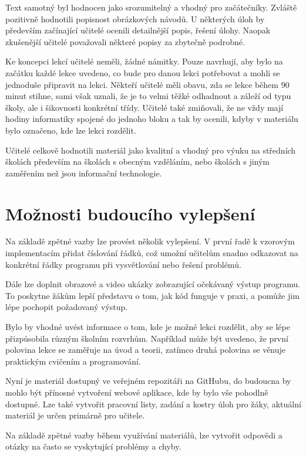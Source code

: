 \documentclass[
  digital,     %
  oneside,     %
  nosansbold,  %
  colorbold, %
  lof,         %
  nolot,         %
]{fithesis4}
\begin{document}
Text samotný byl hodnocen jako srozumitelný a vhodný pro začátečníky. Zvláště pozitivně hodnotili  popisnost obrázkových návodů. U některých úloh by především začínající učitelé ocenili detailnější popis, řešení úlohy. Naopak zkušenější učitelé považovali některé popisy za zbytečně podrobné.

Ke koncepci lekcí učitelé neměli, žádné námitky. Pouze navrhují, aby bylo na začátku každé lekce uvedeno, co bude pro danou lekci potřebovat a mohli se jednoduše připravit na lekci. Někteří učitelé měli obavu, zda se lekce během 90 minut stihne, sami však uznali, že je to velmi těžké odhadnout a záleží od typu školy, ale i šikovnosti konkrétní třídy.  Učitelé také zmiňovali, že ne vždy mají hodiny informatiky spojené do jednoho bloku a tak by ocenili, kdyby v materiálu bylo označeno, kde lze lekci rozdělit. 

Učitelé celkově hodnotili materiál jako kvalitní a vhodný pro výuku na středních školách především na školách s obecným vzděláním, nebo školách s jiným zaměřením než jsou informační technologie.

\section{Možnosti budoucího vylepšení}
Na základě zpětné vazby lze provést několik vylepšení. V první řadě k vzorovým implementacím přidat číslování řádků, což umožní učitelům snadno odkazovat na konkrétní řádky programu při vysvětlování nebo řešení problémů.

Dále lze doplnit obrazové a video ukázky zobrazující očekávaný výstup programu. To poskytne žákům lepší představu o tom, jak kód funguje v praxi, a pomůže jim lépe pochopit požadovaný výstup.

Bylo by vhodné uvést informace o tom, kde je možné lekci rozdělit, aby se lépe přizpůsobila různým školním rozvrhům. Například může být uvedeno, že první polovina lekce se zaměřuje na úvod a teorii, zatímco druhá polovina se věnuje praktickým cvičením a programování.

Nyní je materiál dostupný ve veřejném repozitáři na GitHubu, do budoucna by mohlo být přínosné vytvoření webové aplikace, kde by bylo vše pohodlně dostupné. Lze také vytvořit pracovní listy, zadání a kostry úloh pro žáky, aktuální materiál je určen primárně pro učitele.

Na základě zpětné vazby během využívání materiálů, lze vytvořit odpovědi a otázky na často se vyskytující problémy a chyby.
\end{document}
